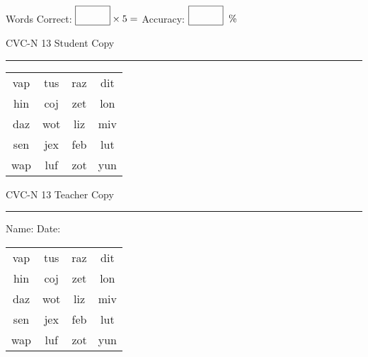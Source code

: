 \documentclass{memoir}
\begin{document}
\small

Words Correct: $\fbox{\phantom{\huge 100}} \times 5 = $ Accuracy: $\fbox{\phantom{\huge 100}}\;\; \%$ 

\vfill

\newpage


\footnotesize \noindent
CVC-N 13 \hfill Student Copy
\smallskip
\hrule

\Large

\setlength{\tabcolsep}{14pt}
\def\arraystretch{2}

{\selectfont


\begin{vplace}[0.5]
\begin{center}
\begin{tabular}{cccc}
vap & tus & raz & dit \\
hin & coj & zet & lon \\
daz & wot & liz & miv \\
sen & jex & feb & lut \\
wap & luf & zot & yun \\
\end{tabular}
\end{center}
\end{vplace}

}

\newpage

\footnotesize \noindent
CVC-N 13 \hfill Teacher Copy
\smallskip
\hrule

\small

\vfill

\noindent
Name: \underline{\hspace{1.75in}} \hfill Date: \underline{\hspace{1in}}

\Large

{\selectfont


\begin{vplace}[0.5]
\begin{center}
\begin{tabular}{cccc}
vap & tus & raz & dit \\
hin & coj & zet & lon \\
daz & wot & liz & miv \\
sen & jex & feb & lut \\
wap & luf & zot & yun \\
\end{tabular}
\end{center}
\end{vplace}



}
\end{document}
